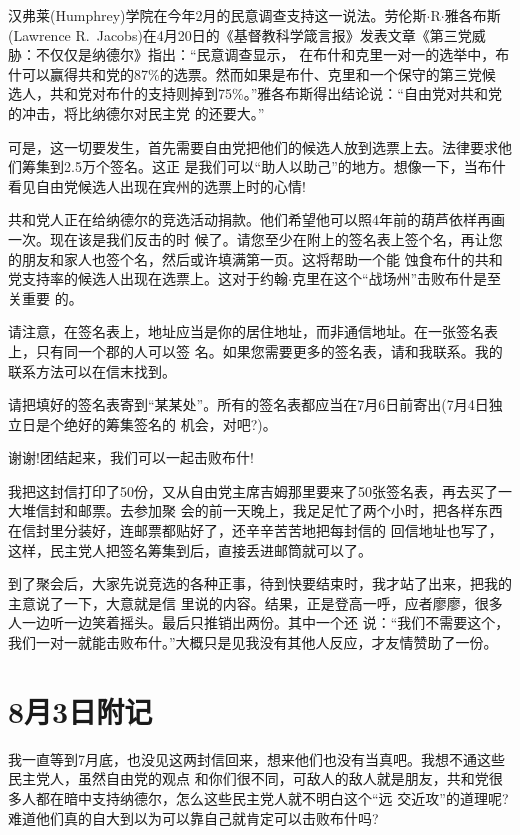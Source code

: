 ﻿\documentclass[11pt]{article}
\begin{document}
汉弗莱(Humphrey)学院在今年2月的民意调查支持这一说法。劳伦斯$\cdot$R$\cdot$雅各布斯(Lawrence
R.~Jacobs)在4月20日的《基督教科学箴言报》发表文章《第三党威胁：不仅仅是纳德尔》指出：``民意调查显示，
在布什和克里一对一的选举中，布什可以赢得共和党的87\%的选票。然而如果是布什、克里和一个保守的第三党候
选人，共和党对布什的支持则掉到75\%。''雅各布斯得出结论说：``自由党对共和党的冲击，将比纳德尔对民主党
的还要大。''

可是，这一切要发生，首先需要自由党把他们的候选人放到选票上去。法律要求他们筹集到2.5万个签名。这正
是我们可以``助人以助己''的地方。想像一下，当布什看见自由党候选人出现在宾州的选票上时的心情!

共和党人正在给纳德尔的竞选活动捐款。他们希望他可以照4年前的葫芦依样再画一次。现在该是我们反击的时
候了。请您至少在附上的签名表上签个名，再让您的朋友和家人也签个名，然后或许填满第一页。这将帮助一个能
蚀食布什的共和党支持率的候选人出现在选票上。这对于约翰$\cdot$克里在这个``战场州''击败布什是至关重要
的。

请注意，在签名表上，地址应当是你的居住地址，而非通信地址。在一张签名表上，只有同一个郡的人可以签
名。如果您需要更多的签名表，请和我联系。我的联系方法可以在信末找到。

请把填好的签名表寄到``某某处''。所有的签名表都应当在7月6日前寄出(7月4日独立日是个绝好的筹集签名的
机会，对吧?)。

谢谢!团结起来，我们可以一起击败布什!

我把这封信打印了50份，又从自由党主席吉姆那里要来了50张签名表，再去买了一大堆信封和邮票。去参加聚
会的前一天晚上，我足足忙了两个小时，把各样东西在信封里分装好，连邮票都贴好了，还辛辛苦苦地把每封信的
回信地址也写了，这样，民主党人把签名筹集到后，直接丢进邮筒就可以了。

到了聚会后，大家先说竞选的各种正事，待到快要结束时，我才站了出来，把我的主意说了一下，大意就是信
里说的内容。结果，正是登高一呼，应者廖廖，很多人一边听一边笑着摇头。最后只推销出两份。其中一个还
说：``我们不需要这个，我们一对一就能击败布什。''大概只是见我没有其他人反应，才友情赞助了一份。

\section{8月3日附记}

我一直等到7月底，也没见这两封信回来，想来他们也没有当真吧。我想不通这些民主党人，虽然自由党的观点
和你们很不同，可敌人的敌人就是朋友，共和党很多人都在暗中支持纳德尔，怎么这些民主党人就不明白这个``远
交近攻''的道理呢?难道他们真的自大到以为可以靠自己就肯定可以击败布什吗?
\end{document}
